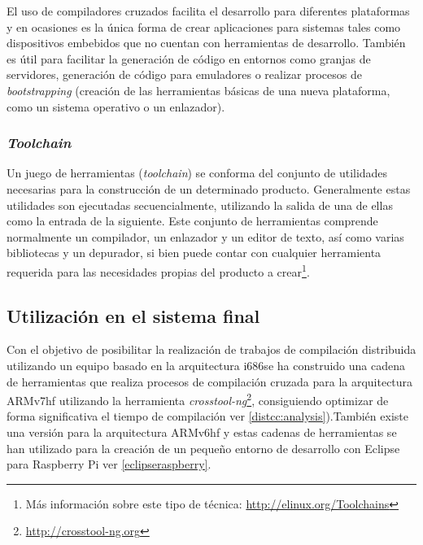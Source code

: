 El uso de compiladores cruzados facilita el desarrollo para diferentes plataformas y en ocasiones es la única forma de crear aplicaciones para sistemas tales como dispositivos embebidos que no cuentan con herramientas de desarrollo. También es útil para facilitar la generación de código en entornos como granjas de servidores, generación de código para emuladores o realizar procesos de \textit{bootstrapping} (creación de las herramientas básicas de una nueva plataforma, como un sistema operativo o un enlazador).


\subsubsection{\textit{Toolchain}}

Un juego de herramientas (\textit{toolchain}) se conforma del conjunto de utilidades necesarias para la construcción de un determinado producto. Generalmente estas utilidades son ejecutadas secuencialmente, utilizando la salida de una de ellas como la entrada de la siguiente. Este conjunto de herramientas comprende normalmente un compilador, un enlazador y un editor de texto, así como varias bibliotecas y un depurador, si bien puede contar con cualquier herramienta requerida para las necesidades propias del producto a crear\footnote{Más información sobre este tipo de técnica: \href{http://elinux.org/Toolchains}{http://elinux.org/Toolchains}}.

\subsection{Utilización en el sistema final}
Con el objetivo de posibilitar la realización de trabajos de compilación distribuida utilizando un equipo basado en la arquitectura i686 se ha construido una cadena de herramientas que realiza procesos de compilación cruzada para la arquitectura ARMv7hf utilizando la herramienta \textit{crosstool-ng}\footnote{\href{http://www.crosstool-ng.org/}{http://crosstool-ng.org}}, consiguiendo optimizar de forma significativa el tiempo de compilación ver \ref{distcc:analysis}).También existe una versión para la arquitectura ARMv6hf \citationneeded[crear] y estas cadenas de  herramientas se han utilizado para la creación de un pequeño entorno de desarrollo con Eclipse para Raspberry Pi ver \ref{eclipseraspberry}.


